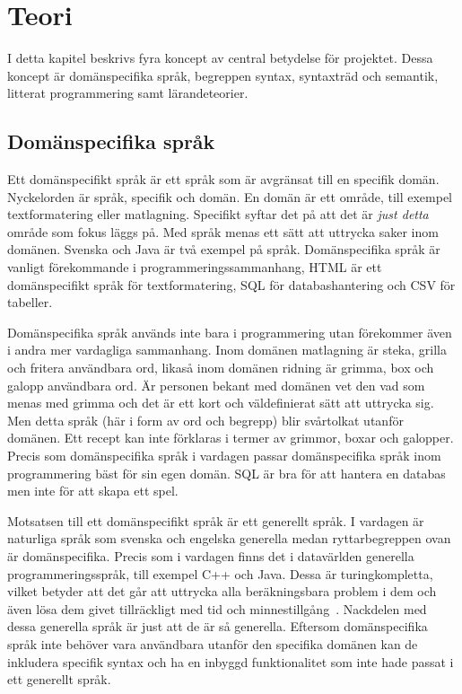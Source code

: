 
\chapter{Teori}

I detta kapitel beskrivs fyra koncept av central betydelse för projektet. Dessa
koncept är domänspecifika språk, begreppen syntax, syntaxträd och semantik,
litterat programmering samt lärandeteorier.

\section{Domänspecifika språk}

Ett domänspecifikt språk är ett språk som är avgränsat till en specifik domän.
Nyckelorden är språk, specifik och domän. En domän är ett område, till exempel
textformatering eller matlagning. Specifikt syftar det på att det är \textit{just
detta} område som fokus läggs på. Med språk menas ett sätt att uttrycka
saker inom domänen. Svenska och Java är två exempel på språk.
Domänspecifika språk är vanligt förekommande i programmeringssammanhang, HTML är
ett domänspecifikt språk för textformatering, SQL för databashantering och
CSV för tabeller.

Domänspecifika språk används inte bara i programmering utan förekommer även i
andra mer vardagliga sammanhang. Inom domänen matlagning är steka, grilla och
fritera användbara ord, likaså inom domänen ridning är grimma, box och galopp
användbara ord. Är personen bekant med domänen vet den vad som menas med grimma
och det är ett kort och väldefinierat sätt att uttrycka sig. Men detta språk (här
i form av ord och begrepp) blir svårtolkat utanför domänen. Ett recept kan inte
förklaras i termer av grimmor, boxar och galopper.
Precis som domänspecifika språk i vardagen passar
domänspecifika språk inom programmering bäst för sin egen domän. SQL är bra för
att hantera en databas men inte för att skapa ett spel.

Motsatsen till ett domänspecifikt språk är ett generellt språk. I
vardagen är naturliga språk som svenska och engelska generella medan
ryttarbegreppen ovan är domänspecifika. Precis som i vardagen finns
det i datavärlden generella programmeringsspråk, till exempel C++ och
Java. Dessa är turingkompletta, vilket betyder att det går att
uttrycka alla beräkningsbara problem i dem och även lösa dem givet
tillräckligt med tid och
minnestillgång~\cite{turing_book}. Nackdelen med
dessa generella språk är just att de är så generella. Eftersom
domänspecifika språk inte behöver vara användbara utanför den
specifika domänen kan de inkludera specifik syntax och ha en inbyggd
funktionalitet som inte hade passat i ett generellt språk.


